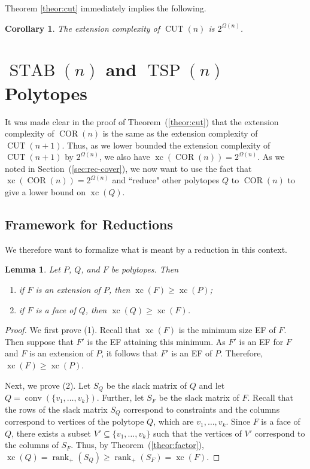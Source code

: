 \documentclass{article}
\newtheorem{lemma}[theorem]{\sc Lemma}
\newtheorem{corollary}[theorem]{\sc Corollary}
\theoremstyle{definition}
\theoremstyle{remark}
\newcommand{\nrank}{\operatorname{rank}_+}
\newcommand{\conv}{\operatorname{conv}}
\newcommand{\xc}{\operatorname{xc}}
\newcommand{\TSP}{\operatorname{TSP}}
\newcommand{\STAB}{\operatorname{STAB}}
\newcommand{\CUT}{\operatorname{CUT}}
\newcommand{\COR}{\operatorname{COR}}
\begin{document}
Theorem \ref{theor:cut} immediately implies the following.

\begin{corollary}\label{cor:cut}
The extension complexity of $\CUT(n)$ is $2^{\Omega(n)}$.
\end{corollary}

\section{$\STAB(n)$ and $\TSP(n)$ Polytopes}

It was made clear in the proof of Theorem~(\ref{theor:cut}) that the extension complexity of $\COR(n)$ is the same as the extension complexity of $\CUT(n+1)$. Thus, as we lower bounded the extension complexity of $\CUT(n+1)$ by $2^{\Omega(n)}$, we also have $\xc(\COR(n)) = 2^{\Omega(n)}$. As we noted in Section~(\ref{sec:rec-cover}), we now want to use the fact that $\xc(\COR(n)) = 2^{\Omega(n)}$ and ``reduce" other polytopes $Q$ to $\COR(n)$ to give a lower bound on $\xc(Q)$.

\subsection{Framework for Reductions}\label{sec:reduct}

We therefore want to formalize what is meant by a reduction in this context.

\begin{lemma}\label{lem:reduct}
Let $P$, $Q$, and $F$ be polytopes. Then
\begin{enumerate} \itemsep0pt
\item if $F$ is an extension of $P$, then $\xc(F) \ge \xc(P)$;
\item if $F$ is a face of $Q$, then $\xc(Q) \ge \xc(F)$.
\end{enumerate}
\end{lemma}
\begin{proof}
We first prove (1). Recall that $\xc(F)$ is the minimum size EF of $F$. Then suppose that $F'$ is the EF attaining this minimum. As $F'$ is an EF for $F$ and $F$ is an extension of $P$, it follows that $F'$ is an EF of $P$. Therefore, $\xc(F) \ge \xc(P)$. 

Next, we prove (2). Let $S_Q$ be the slack matrix of $Q$ and let $Q = \conv(\{v_1, \ldots, v_k\})$. Further, let $S_F$ be the slack matrix of $F$. Recall that the rows of the slack matrix $S_Q$ correspond to constraints and the columns correspond to vertices of the polytope $Q$, which are $v_1, \ldots, v_k$. Since $F$ is a face of $Q$, there exists a subset $V' \subseteq \{v_1, \ldots, v_k\}$ such that the vertices of $V'$ correspond to the columns of $S_F$. Thus, by Theorem~(\ref{theor:factor}), $\xc(Q) = \nrank(S_Q) \ge \nrank(S_F) = \xc(F)$.
\end{proof}
\end{document}
